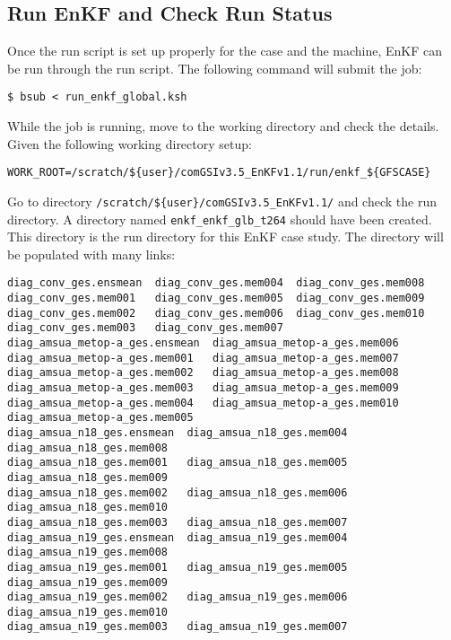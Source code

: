 \subsection{Run EnKF and Check Run Status}

Once the run script is set up properly for the case and the machine, EnKF can be run through the run script. The following command will submit the job:

\begin{footnotesize}
\begin{verbatim}
$ bsub < run_enkf_global.ksh
\end{verbatim}
\end{footnotesize}
While the job is running, move to the working directory and check the details. Given the following working directory setup:
\begin{footnotesize}
\begin{verbatim}
WORK_ROOT=/scratch/${user}/comGSIv3.5_EnKFv1.1/run/enkf_${GFSCASE}
\end{verbatim}
\end{footnotesize}

Go to directory \verb|/scratch/${user}/comGSIv3.5_EnKFv1.1/| and check the run directory. A directory named \verb|enkf_enkf_glb_t264| should have been created. This directory is the run directory for this EnKF case study. The directory will be populated with many links:
\begin{footnotesize}
\begin{verbatim}
diag_conv_ges.ensmean  diag_conv_ges.mem004  diag_conv_ges.mem008
diag_conv_ges.mem001   diag_conv_ges.mem005  diag_conv_ges.mem009
diag_conv_ges.mem002   diag_conv_ges.mem006  diag_conv_ges.mem010
diag_conv_ges.mem003   diag_conv_ges.mem007
diag_amsua_metop-a_ges.ensmean  diag_amsua_metop-a_ges.mem006
diag_amsua_metop-a_ges.mem001   diag_amsua_metop-a_ges.mem007
diag_amsua_metop-a_ges.mem002   diag_amsua_metop-a_ges.mem008
diag_amsua_metop-a_ges.mem003   diag_amsua_metop-a_ges.mem009
diag_amsua_metop-a_ges.mem004   diag_amsua_metop-a_ges.mem010
diag_amsua_metop-a_ges.mem005
diag_amsua_n18_ges.ensmean  diag_amsua_n18_ges.mem004  diag_amsua_n18_ges.mem008
diag_amsua_n18_ges.mem001   diag_amsua_n18_ges.mem005  diag_amsua_n18_ges.mem009
diag_amsua_n18_ges.mem002   diag_amsua_n18_ges.mem006  diag_amsua_n18_ges.mem010
diag_amsua_n18_ges.mem003   diag_amsua_n18_ges.mem007
diag_amsua_n19_ges.ensmean  diag_amsua_n19_ges.mem004  diag_amsua_n19_ges.mem008
diag_amsua_n19_ges.mem001   diag_amsua_n19_ges.mem005  diag_amsua_n19_ges.mem009
diag_amsua_n19_ges.mem002   diag_amsua_n19_ges.mem006  diag_amsua_n19_ges.mem010
diag_amsua_n19_ges.mem003   diag_amsua_n19_ges.mem007
\end{verbatim}
\end{footnotesize}

